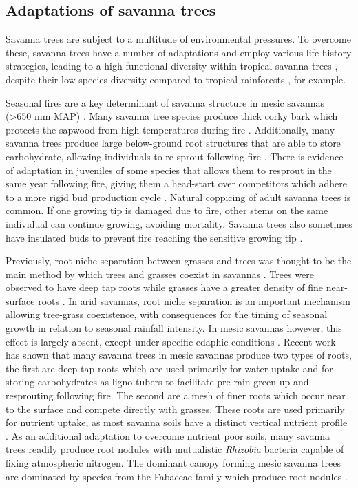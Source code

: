 \begin{refsection}
\subsection{Adaptations of savanna trees}

Savanna trees are subject to a multitude of environmental pressures. To overcome these, savanna trees have a number of adaptations and employ various life history strategies, leading to a high functional diversity within tropical savanna trees \citep{Solbrig1996}, despite their low species diversity compared to tropical rainforests \citep{Solbrig1996}, for example.

Seasonal fires are a key determinant of savanna structure in mesic savannas (>650 mm MAP) \citep{Sankaran2005}. Many savanna tree species produce thick corky bark which protects the sapwood from high temperatures during fire \citep{Hoffmann2012, Lawes2011, Dantas2013}. Additionally, many savanna trees produce large below-ground root structures that are able to store carbohydrate, allowing individuals to re-sprout following fire \citep{Wigley2019}. There is evidence of adaptation in juveniles of some species that allows them to resprout in the same year following fire, giving them a head-start over competitors which adhere to a more rigid bud production cycle \citep{Wiegand2006}. Natural coppicing of adult savanna trees is common. If one growing tip is damaged due to fire, other stems on the same individual can continue growing, avoiding mortality. Savanna trees also sometimes have insulated buds to prevent fire reaching the sensitive growing tip \citep{CharlesDominique2015}.

Previously, root niche separation between grasses and trees was thought to be the main method by which trees and grasses coexist in savannas \citep{Walter1971}. Trees were observed to have deep tap roots while grasses have a greater density of fine near-surface roots \citep{Timberlake1993}. In arid savannas, root niche separation is an important mechanism allowing tree-grass coexistence, with consequences for the timing of seasonal growth in relation to seasonal rainfall intensity. In mesic savannas however, this effect is largely absent, except under specific edaphic conditions \citep{Case2020, Ketter2018, Sankaran2004, Higgins2000}. Recent work has shown that many savanna trees in mesic savannas produce two types of roots, the first are deep tap roots which are used primarily for water uptake and for storing carbohydrates as ligno-tubers to facilitate pre-rain green-up and resprouting following fire. The second are a mesh of finer roots which occur near to the surface and compete directly with grasses. These roots are used primarily for nutrient uptake, as most savanna soils have a distinct vertical nutrient profile \citep{Tomlinson2012, February2013}.  As an additional adaptation to overcome nutrient poor soils, many savanna trees readily produce root nodules with mutualistic \textit{Rhizobia} bacteria capable of fixing atmospheric nitrogen. The dominant canopy forming mesic savanna trees are dominated by species from the Fabaceae family which produce root nodules \citep{Hogberg1986}. 


\end{refsection}
